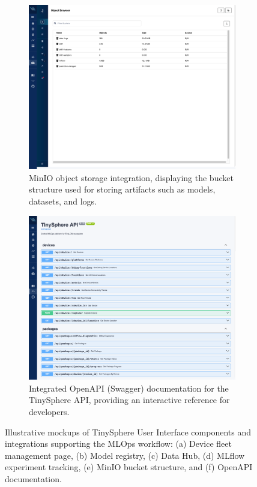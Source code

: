\begin{figure}[htbp]
    \vspace{1em}
    \begin{subfigure}[b]{0.48\textwidth}
        \centering
        \includegraphics[width=\textwidth]{figs/framework/minio-page.png}
        \caption{MinIO object storage integration, displaying the bucket structure used for storing artifacts such as models, datasets, and logs.}
        \label{fig:ui_minio_integration}
    \end{subfigure}
    \hfill
    \begin{subfigure}[b]{0.48\textwidth}
        \centering
        \includegraphics[width=\textwidth]{figs/framework/api-page.png}
        \caption{Integrated OpenAPI (Swagger) documentation for the TinySphere API, providing an interactive reference for developers.}
        \label{fig:ui_openapi_docs}
    \end{subfigure}

    \caption[Illustrative mockups of TinySphere User Interface components]{Illustrative mockups of TinySphere User Interface components and integrations supporting the MLOps workflow: (a) Device fleet management page, (b) Model registry, (c) Data Hub, (d) MLflow experiment tracking, (e) MinIO bucket structure, and (f) OpenAPI documentation.}
    \label{fig:tinysphere_ui_examples}
\end{figure}
